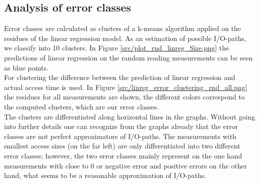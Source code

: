 \documentclass{superfri}
\begin{document}
\subsection{Analysis of error classes}
Error classes are calculated as clusters of a k-means algorithm applied on the residues of the linear regression model.
As an estimation of possible I/O-paths, we classify into 10 clusters.
In Figure \ref{src/plot_rnd_linreg_Size.png} the predictions of linear regression on the random reading measurements can be seen as blue points.
\\
For clustering the difference between the prediction of linear regression and actual access time is used.
In Figure \ref{src/linreg_error_clustering_rnd_all.png} the residues for all measurements are shown, the different colors correspond to the computed clusters, which are our error classes.
\\
The clusters are differentiated along horizontal lines in the graphs.
Without going into further details one can recognize from the graphs already that the error classes are not perfect approximators of I/O-paths.
The measurements with smallest access sizes (on the far left) are only differentiated into two different error classes; however, the two error classes mainly represent  on the one hand measurements with close to 0 or negative error and positive errors on the other hand, what seems to be a reasonable approximation of I/O-paths.\medskip
\end{document}
